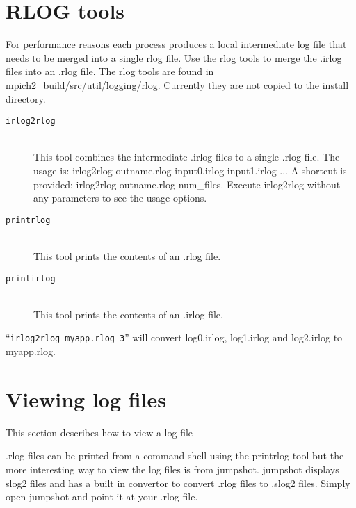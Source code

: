 \documentclass[dvipdfm,11pt]{article}
\begin{document}
\section{RLOG tools}
\label{sec:tools}
For performance reasons each process produces a local intermediate log file that
needs to be merged into a single rlog file.  Use the rlog tools to merge the .irlog files
 into an .rlog file.  The rlog tools are found in mpich2\_build/src/util/logging/rlog.
Currently they are not copied to the install directory.

\begin{description}
\item[\texttt{irlog2rlog}]\mbox{}\\
This tool combines the intermediate .irlog files to a single .rlog file.
The usage is: irlog2rlog outname.rlog input0.irlog input1.irlog ...
A shortcut is provided: irlog2rlog outname.rlog num\_files.  Execute irlog2rlog
without any parameters to see the usage options.

\item[\texttt{printrlog}]\mbox{}\\
This tool prints the contents of an .rlog file.

\item[\texttt{printirlog}]\mbox{}\\
This tool prints the contents of an .irlog file.
\end{description}

``\texttt{irlog2rlog myapp.rlog 3}'' will convert log0.irlog, log1.irlog and log2.irlog
to myapp.rlog.

\section{Viewing log files}
This section describes how to view a log file

.rlog files can be printed from a command shell using the printrlog tool but
the more interesting way to view the log files is from jumpshot.  jumpshot
displays slog2 files and has a built in convertor to convert .rlog files to
.slog2 files.  Simply open jumpshot and point it at your .rlog file.



\end{document}
